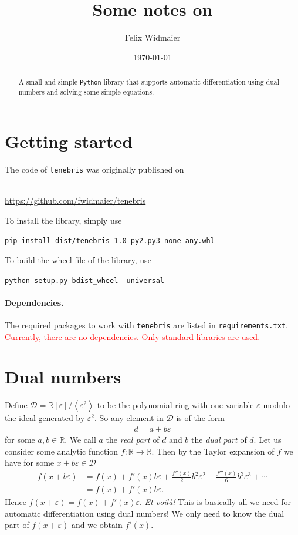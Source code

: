 \documentclass[a4paper, 11pt]{article}
\title{\bfseries\sffamily Some notes on \tenebris{}}
\author{Felix Widmaier}
\date{\today}
\newcommand{\tenebris}{\texttt{tenebris}}
\newcommand{\Duals}[1]{#1[\varepsilon]/\left\langle\varepsilon^2\right\rangle}
\newcommand{\boxedcode}{%
    \collectbox{%
        \setlength{\fboxsep}{5pt}%
        \fbox{\BOXCONTENT}%
    }%
}
\begin{document}
    \maketitle
    \begin{abstract}
        A small and simple \texttt{Python} library that supports automatic differentiation using
        dual numbers and solving some simple equations.
    \end{abstract}

    \section*{Getting started}
The code of \tenebris{} was originally published on
\begin{center}
    \\
    \vspace*{0.5cm}
    \href{https://github.com/fwidmaier/tenebris}{\url{https://github.com/fwidmaier/tenebris}}
\end{center}
To install the library, simply use
\begin{center}
    \boxedcode{\texttt{pip install dist/tenebris-1.0-py2.py3-none-any.whl}}
\end{center}
To build the wheel file of the library, use
\begin{center}
    \boxedcode{\texttt{python setup.py bdist\_wheel --universal}}
\end{center}
\paragraph{Dependencies.} The required packages to work with \tenebris{} are listed in \texttt{requirements.txt}.
    \textcolor{red}{Currently, there are no dependencies. Only standard libraries are used.}
\newpage
\section{Dual numbers}
    Define $\mathcal{D} = \Duals{\mathbb R}$ to be the polynomial ring with one variable $\varepsilon$
    modulo the ideal generated by $\varepsilon^2$. So any element in $\mathcal{D}$ is of the form
    \begin{align*}
        d = a + b\varepsilon
    \end{align*}
    for some $a,b\in\mathbb R$. We call $a$ the \textit{real part} of $d$ and $b$ the \textit{dual part} of $d$.
    Let us consider some analytic function $f\colon\mathbb R\to\mathbb R$.
    Then by the Taylor expansion of $f$ we have for some $x + b\varepsilon\in\mathcal{D}$
    \begin{align*}
        f(x + b\varepsilon) &= f(x) + f'(x)b\varepsilon + \frac{f''(x)}{2}b^2\varepsilon^2
        + \frac{f'''(x)}{6}b^3\varepsilon^3 + \cdots\\
        &= f(x) + f'(x)b\varepsilon.
    \end{align*}
    Hence $f(x + \varepsilon) = f(x) + f'(x)\varepsilon$.
    \textit{Et voilà!}
    This is basically all we need for automatic differentiation using dual numbers!
    We only need to know the dual part of $f(x + \varepsilon)$ and we obtain $f'(x)$.
\end{document}
